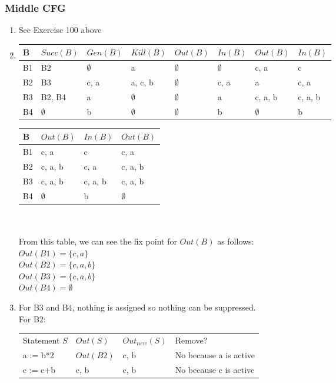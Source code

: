 \documentclass[12pt,fleqn]{article}		%
\begin{document}
\subsubsection{Middle CFG}
\begin{enumerate}
\item See Exercise 100 above
\item 
\begin{tabularx}{\textwidth}{| l | X | X | X || X | X || X | X ||}
\hline
B & $Succ(B) $ & $Gen(B)$ & $Kill(B)$ & $Out(B)$ & $In(B)$ & $Out(B)$ & $In(B)$\\
\hline
B1 & B2 & $\emptyset$ & a & $\emptyset$ & $\emptyset$ & c, a & c \\
\hline
B2 & B3 & c, a & a, c, b & $\emptyset$ & c, a & a & c, a \\
\hline
B3 & B2, B4 & a & $\emptyset$ & $\emptyset$ & a & c, a, b & c, a, b\\
\hline
B4 & $\emptyset$ & b & $\emptyset$ & $\emptyset$ & b & $\emptyset$ & b \\
\hline
\end{tabularx}
\begin{tabularx}{\textwidth}{| l || X | X || X |}
\hline
B & $Out(B)$ & $In(B)$ & $Out(B)$\\
\hline
B1 & c, a & c & c, a\\
\hline
B2 & c, a, b & c, a & c, a, b\\
\hline
B3 & c, a, b & c, a, b & c, a, b\\
\hline
B4 & $\emptyset$ & b & $\emptyset$\\
\hline
\end{tabularx}
\\\\
From this table, we can see the fix point for $Out(B)$ as follows:\\
$Out(B1) = \{c, a\}$\\
$Out(B2) = \{c, a, b\}$\\
$Out(B3) = \{c, a, b\}$\\
$Out(B4) = \emptyset$\\
\item 
For B3 and B4, nothing is assigned so nothing can be suppressed.\\
For B2:\\
\begin{tabularx}{\textwidth}{X X X X}
Statement $S$ & $Out(S)$ & $Out_{new}(S)$ & Remove?\\
a := b*2 & $Out(B2)$ & c, b & No because a is active\\
c := c+b & c, b & c, b & No because c is active\\

\end{tabularx}
\end{enumerate}
\end{document}
